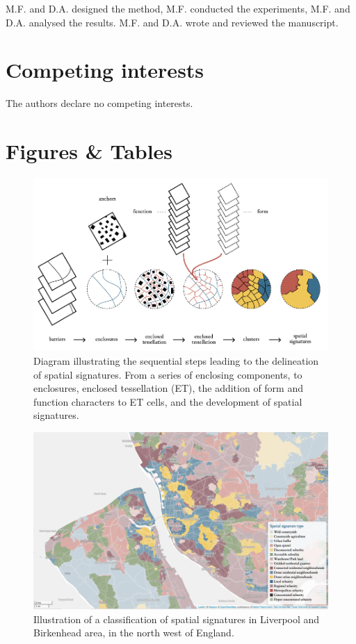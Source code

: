 \documentclass[fleqn,10pt]{wlscirep}
\begin{document}

M.F. and D.A. designed the method, M.F. conducted the experiments, M.F. and D.A.
analysed the results. M.F. and D.A. wrote and reviewed the manuscript.

\section*{Competing interests}

The authors declare no competing interests.

\section*{Figures \& Tables}


\begin{figure}[ht]
    \includegraphics[width=\linewidth]{fig/workflow.pdf}
\caption{Diagram illustrating the sequential steps leading to the delineation of
spatial signatures. From a series of enclosing components, to enclosures,
enclosed tessellation (ET), the addition of form and function characters to ET
cells, and the development of spatial signatures.}
\label{fig:workflow}
\end{figure}


\begin{figure}[ht]
    \includegraphics[width=\linewidth]{fig/signatures_map.png}
\caption{Illustration of a classification of spatial signatures in Liverpool and
    Birkenhead area, in the north west of England.}
\label{fig:map}
\end{figure}
\end{document}
